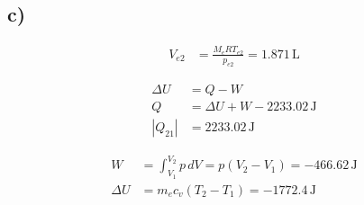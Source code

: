 

\subsection*{c)}
\begin{align*}
V_{e2} &= \frac{M_e R T_{e2}}{p_{e2}} = 1.871 \, \text{L}
\end{align*}

\begin{align*}
\Delta U &= Q - W \\
Q &= \Delta U + W - 2233.02 \, \text{J} \\
|Q_{21}| &= 2233.02 \, \text{J}
\end{align*}

\begin{align*}
W &= \int_{V_1}^{V_2} p \, dV = p (V_2 - V_1) = -466.62 \, \text{J} \\
\Delta U &= m_e c_v (T_2 - T_1) = -1772.4 \, \text{J}
\end{align*}